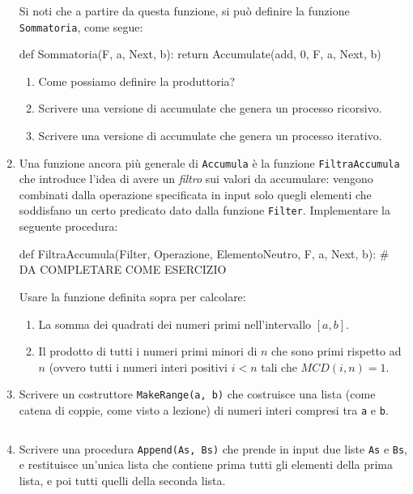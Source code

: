 \documentclass[11pt,a4]{article}
\newcommand{\mybox}[2]{$\quad$\fbox{
\begin{minipage}{#1cm}
\hfill\vspace{#2cm}
\end{minipage}
}}
\begin{document}
\begin{enumerate}
Si noti che a partire da questa funzione, si può definire la funzione {\tt Sommatoria}, come segue:
\begin{python}
def Sommatoria(F, a, Next, b):
    return Accumulate(add, 0, F, a, Next, b)
\end{python}

\begin{enumerate}
\item Come possiamo definire la produttoria?
\item Scrivere una versione di accumulate che genera un processo ricorsivo. 
\item Scrivere una versione di accumulate che genera un processo iterativo. 
\end{enumerate}

\item Una funzione ancora più generale di {\tt Accumula} è la funzione {\tt FiltraAccumula} che introduce l'idea di 
avere un {\it filtro} sui valori da accumulare: vengono combinati dalla operazione specificata in input solo quegli elementi
che soddisfano un certo predicato dato dalla funzione {\tt Filter}. Implementare la seguente procedura:
\begin{python}
def FiltraAccumula(Filter, Operazione, ElementoNeutro, F, a, Next, b):
    # DA COMPLETARE COME ESERCIZIO
\end{python}
Usare la funzione definita sopra per calcolare:
\begin{enumerate}
\item La somma dei quadrati dei numeri primi nell'intervallo $[a,b]$.
\item Il prodotto di tutti i numeri primi minori di $n$ che sono primi rispetto ad $n$ (ovvero tutti i numeri interi positivi
$i < n$ tali che $MCD(i,n) = 1$.
\end{enumerate}

\item Scrivere un costruttore {\tt MakeRange(a, b)} che costruisce una lista (come catena di coppie, come visto a lezione)
di numeri interi compresi tra {\tt a} e {\tt b}.

\mybox{15}{1.5}

\item Scrivere una procedura {\tt Append(As, Bs)} che prende in input due liste {\tt As} e {\tt Bs}, 
e restituisce un'unica lista che contiene prima tutti gli elementi della prima lista, e poi tutti quelli della seconda lista.


\end{enumerate}
\end{document}
